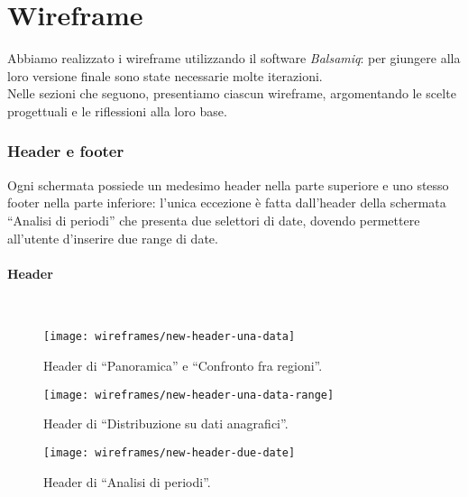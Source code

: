 \documentclass[../../../main.tex]{subfiles}
\begin{document}
\section{Wireframe}\label{s:wireframe}
Abbiamo realizzato i wireframe utilizzando il software \textit{Balsamiq}: per giungere alla loro versione finale sono state necessarie molte iterazioni.\\
Nelle sezioni che seguono, presentiamo ciascun wireframe, argomentando le scelte progettuali e le riflessioni alla loro base.

\subsubsection{Header e footer}\label{ss:header-e-footer}
Ogni schermata possiede un medesimo header nella parte superiore e uno stesso footer nella parte inferiore: l'unica eccezione è fatta dall'header della schermata ``Analisi di periodi'' che presenta due selettori di date, dovendo permettere all'utente d'inserire due range di date.

\paragraph{Header}\mbox{}\\
\begin{figure}[H]
    \centering
    \texttt{[image: wireframes/new-header-una-data]}
    \caption{Header di ``Panoramica'' e ``Confronto fra regioni''.}
    \label{fig:header-una-data}
\end{figure}

\begin{figure}[H]
    \centering
    \texttt{[image: wireframes/new-header-una-data-range]}
    \caption{Header di ``Distribuzione su dati anagrafici''.}
    \label{fig:header-una-data-range}
\end{figure}

\begin{figure}[H]
    \centering
    \texttt{[image: wireframes/new-header-due-date]}
    \caption{Header di ``Analisi di periodi''.}
    \label{fig:header-due-date}
\end{figure}
\end{document}

